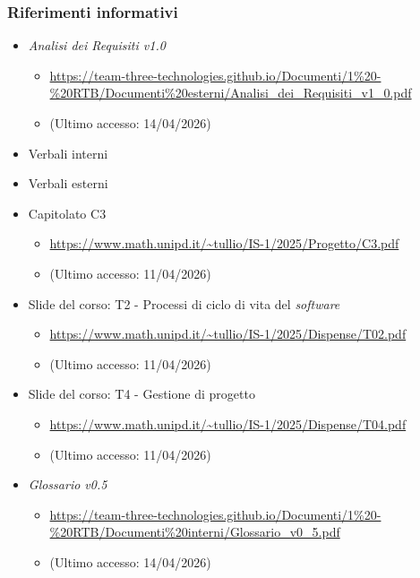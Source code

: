 \documentclass[a4paper,12pt]{article}
\begin{document}
{{            \subsubsection{Riferimenti informativi} {
                \begin{itemize}
                \item \textit{Analisi dei Requisiti v1.0}
                \begin{itemize}
                    \item \url{https://team-three-technologies.github.io/Documenti/1%20-%20RTB/Documenti%20esterni/Analisi_dei_Requisiti_v1_0.pdf}
                    \item[] (Ultimo accesso: 14/04/2026)
                \end{itemize}
                \item Verbali interni
                \item Verbali esterni
                \item Capitolato C3
                \begin{itemize}
                    \item \url{https://www.math.unipd.it/~tullio/IS-1/2025/Progetto/C3.pdf}
                    \item[] (Ultimo accesso: 11/04/2026)
                \end{itemize}
                \item Slide del corso: T2 - Processi di ciclo di vita del \textit{software}
                \begin{itemize}
                    \item \url{https://www.math.unipd.it/~tullio/IS-1/2025/Dispense/T02.pdf}
                    \item[] (Ultimo accesso: 11/04/2026)
                \end{itemize}
                \item Slide del corso: T4 - Gestione di progetto
                \begin{itemize}
                    \item \url{https://www.math.unipd.it/~tullio/IS-1/2025/Dispense/T04.pdf}
                    \item[] (Ultimo accesso: 11/04/2026)
                \end{itemize}
                \item \textit{Glossario v0.5}
                \begin{itemize}
                    \item \url{https://team-three-technologies.github.io/Documenti/1%20-%20RTB/Documenti%20interni/Glossario_v0_5.pdf}
                    \item[] (Ultimo accesso: 14/04/2026)
                \end{itemize}
            \end{itemize}
            }
        }
    }
    
\end{document}
